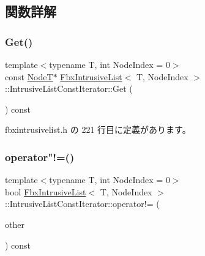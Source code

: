 \subsection{関数詳解}
\mbox{\label{class_fbx_intrusive_list_1_1_intrusive_list_const_iterator_a186a7c02a4957551c0abd46fc77146ab}} 
\subsubsection{\texorpdfstring{Get()}{Get()}}
{\footnotesize\ttfamily template$<$typename T, int Node\+Index = 0$>$ \\
const \hyperlink{class_fbx_intrusive_list_a6ffda382a6d029a042cbb0110853680c}{NodeT}$\ast$ \hyperlink{class_fbx_intrusive_list}{Fbx\+Intrusive\+List}$<$ T, Node\+Index $>$\+::Intrusive\+List\+Const\+Iterator\+::\+Get (\begin{DoxyParamCaption}{ }\end{DoxyParamCaption}) const\hspace{0.3cm}{\ttfamily [inline]}}



 fbxintrusivelist.\+h の 221 行目に定義があります。

\mbox{\label{class_fbx_intrusive_list_1_1_intrusive_list_const_iterator_ab924df909170812a2c12dcee743e7c87}} 
\subsubsection{\texorpdfstring{operator"!=()}{operator!=()}}
{\footnotesize\ttfamily template$<$typename T, int Node\+Index = 0$>$ \\
bool \hyperlink{class_fbx_intrusive_list}{Fbx\+Intrusive\+List}$<$ T, Node\+Index $>$\+::Intrusive\+List\+Const\+Iterator\+::operator!= (\begin{DoxyParamCaption}\item[{const \hyperlink{class_fbx_intrusive_list_1_1_intrusive_list_const_iterator}{Intrusive\+List\+Const\+Iterator} \&}]{other }\end{DoxyParamCaption}) const\hspace{0.3cm}{\ttfamily [inline]}}



